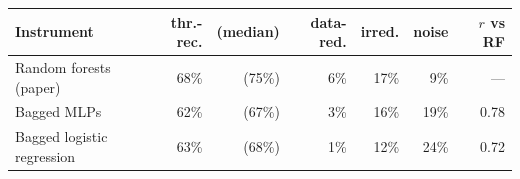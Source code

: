 \begin{tabular}{lrrrrrr}
\toprule
Instrument & thr.-rec. & (median) & data-red. & irred. & noise & $r$ vs RF \\
\midrule
Random forests (paper) & 68\% & (75\%) & 6\% & 17\% & 9\% & --- \\
Bagged MLPs & 62\% & (67\%) & 3\% & 16\% & 19\% & 0.78 \\
Bagged logistic regression & 63\% & (68\%) & 1\% & 12\% & 24\% & 0.72 \\
\bottomrule
\end{tabular}
